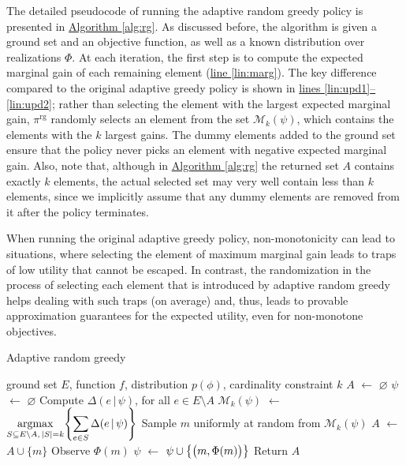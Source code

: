 \documentclass{article}
\newcommand{\algoref}[1]{\hyperref[#1]{Algorithm \ref*{#1}}}
\newcommand{\lineref}[1]{\hyperref[#1]{line \ref*{#1}}}
\newcommand{\linesref}[2]{\hyperref[#1]{lines \ref*{#1}--\ref*{#2}}}
\newcommand*\LET[2]{\STATE #1 $\gets$ #2}
\newcommand{\argmax}{\operatornamewithlimits{argmax}}
\let\originalleft\left
\let\originalright\right
\renewcommand{\left}{\mathopen{}\mathclose\bgroup\originalleft}
\renewcommand{\right}{\aftergroup\egroup\originalright}
\newcommand{\mmid}{\,\vert\,}
\newcommand{\D}[2]{\Delta(#1\mmid#2)}
\newcommand{\pig}{\pi^{\textrm{rg}}}
\newcommand{\Mk}{\mathcal{M}_k}
\begin{document}
The detailed pseudocode of running the adaptive random greedy policy is presented in \algoref{alg:rg}.
As discussed before, the algorithm is given a ground set and an objective function, as well as a known distribution over realizations $\Phi$.
At each iteration, the first step is to compute the expected marginal gain of each remaining element (\lineref{lin:marg}).
The key difference compared to the original adaptive greedy policy is shown in \linesref{lin:upd1}{lin:upd2}; rather than selecting the element with the largest expected marginal gain, $\pig$ randomly selects an element from the set $\Mk(\psi)$, which contains the elements with the $k$ largest gains.
The dummy elements added to the ground set ensure that the policy never picks an element with negative expected marginal gain.
Also, note that, although in \algoref{alg:rg} the returned set $A$ contains exactly $k$ elements, the actual selected set may very well contain less than $k$ elements, since we implicitly assume that any dummy elements are removed from it after the policy terminates.

When running the original adaptive greedy policy, non-monotonicity can lead to situations, where selecting the element of maximum marginal gain leads to traps of low utility that cannot be escaped.
In contrast, the randomization in the process of selecting each element that is introduced by adaptive random greedy helps dealing with such traps (on average) and, thus, leads to provable approximation guarantees for the expected utility, even for non-monotone objectives.

\begin{algorithm}[tb]
  \caption{Adaptive random greedy}
  \label{alg:rg}
  \normalsize{
    \begin{algorithmic}[1]
      \REQUIRE ground set $E$, function $f$, distribution $p(\phi)$, cardinality constraint $k$
      \LET{$A$}{$\varnothing$}
      \LET{$\psi$}{$\varnothing$}
      \STATE Compute $\D{e}{\psi}$, for all $e \in E \setminus A$ \label{lin:marg}
      \LET{$\Mk(\psi)$}{$\displaystyle\argmax_{S \subseteq E \setminus A,\,|S| = k}\left\{\sum_{e \in S} \D{e}{\psi} \right\}$} \label{lin:upd1}
      \STATE Sample $m$ uniformly at random from $\Mk(\psi)$ \label{lin:upd2}
      \LET{$A$}{$A \cup \{m\}$}
      \STATE Observe $\Phi(m)$
      \LET{$\psi$}{$\psi \cup \left\{\big(m, \Phi(m)\big)\right\}$}
      \ENDFOR
      \STATE Return $A$
    \end{algorithmic}
  }
\end{algorithm}
\end{document}
